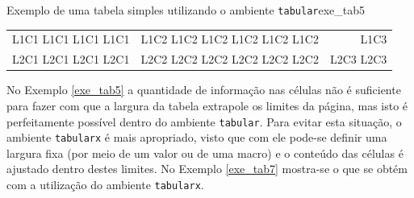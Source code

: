 \begin{texexptitled}[breakable,center lower,enhanced,middle=2mm]{Exemplo de uma tabela simples utilizando o ambiente {\tt tabular}}{exe_tab5}
\begin{tabular}{|l|c|r|}
\hline
L1C1 L1C1 L1C1 L1C1 & L1C2 L1C2 L1C2 L1C2 L1C2 L1C2 & L1C3      \\
L2C1 L2C1 L2C1 L2C1 & L2C2 L2C2 L2C2 L2C2 L2C2 L2C2 & L2C3 L2C3 \\
\hline
\end{tabular}
\end{texexptitled}

No Exemplo \ref{exe_tab5} a quantidade de informação nas células não é suficiente para fazer com que a largura da tabela extrapole os limites da página, mas isto é perfeitamente possível dentro do ambiente {\tt tabular}. Para evitar esta situação, o ambiente {\tt tabularx} é mais apropriado, visto que com ele pode-se definir uma largura fixa (por meio de um valor ou de uma macro) e o conteúdo das células é ajustado dentro destes limites. No Exemplo \ref{exe_tab7} mostra-se o que se obtém com a utilização do ambiente {\tt tabularx}.


%

